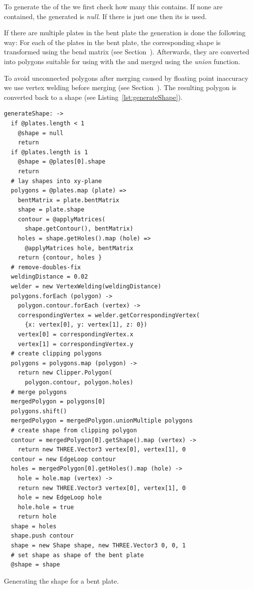 \documentclass[../ClassicThesis.tex]{subfiles}
\begin{document}
To generate the  of the  we first check how many  this  contains. If none are contained, the generated  is \emph{null}. If there is just one  then its  is used.

If there are multiple plates in the bent plate the generation is done the following way: For each of the plates in the bent plate, the corresponding shape is transformed using the bend matrix (see Section~). Afterwards, they are converted into polygons suitable for using with the \jsclipper{} and merged using the \emph{union} function.

To avoid unconnected polygons after merging caused by floating point inaccuracy we use vertex welding before merging (see Section~). The resulting polygon is converted back to a shape (see Listing~\ref{lst:generateShape}).

\begin{listing}[ht]
\begin{verbatim}
generateShape: ->
  if @plates.length < 1
    @shape = null
    return
  if @plates.length is 1
    @shape = @plates[0].shape
    return
  # lay shapes into xy-plane
  polygons = @plates.map (plate) =>
    bentMatrix = plate.bentMatrix
    shape = plate.shape
    contour = @applyMatrices(
      shape.getContour(), bentMatrix)
    holes = shape.getHoles().map (hole) =>
      @applyMatrices hole, bentMatrix
    return {contour, holes }
  # remove-doubles-fix
  weldingDistance = 0.02
  welder = new VertexWelding(weldingDistance)
  polygons.forEach (polygon) ->
    polygon.contour.forEach (vertex) ->
    correspondingVertex = welder.getCorrespondingVertex(
      {x: vertex[0], y: vertex[1], z: 0})
    vertex[0] = correspondingVertex.x
    vertex[1] = correspondingVertex.y
  # create clipping polygons
  polygons = polygons.map (polygon) ->
    return new Clipper.Polygon(
      polygon.contour, polygon.holes)
  # merge polygons
  mergedPolygon = polygons[0]
  polygons.shift()
  mergedPolygon = mergedPolygon.unionMultiple polygons
  # create shape from clipping polygon
  contour = mergedPolygon[0].getShape().map (vertex) ->
    return new THREE.Vector3 vertex[0], vertex[1], 0
  contour = new EdgeLoop contour
  holes = mergedPolygon[0].getHoles().map (hole) ->
    hole = hole.map (vertex) ->
    return new THREE.Vector3 vertex[0], vertex[1], 0
    hole = new EdgeLoop hole
    hole.hole = true
    return hole
  shape = holes
  shape.push contour
  shape = new Shape shape, new THREE.Vector3 0, 0, 1
  # set shape as shape of the bent plate
  @shape = shape
\end{verbatim}
\caption{Generating the shape for a bent plate.}
\label{lst:generateShape}
\end{listing}
\end{document}
